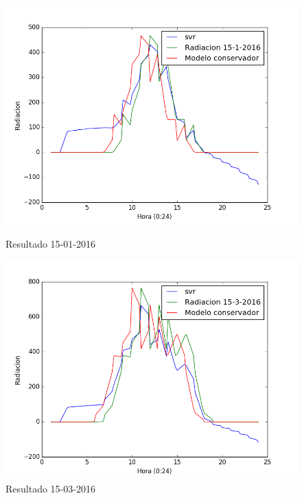\begin{figure}[htb]
		\includegraphics[width=\linewidth]{figures/svr_2016011520160115.png}
		\caption{Resultado 15-01-2016 \label{resultado_svr_1}}
\endminipage\hfill
{}
		\includegraphics[width=\linewidth]{figures/svr_2016031520160315.png}
		\caption{Resultado 15-03-2016 \label{resultado_svr_2}}
\endminipage\hfill
\end{figure}

